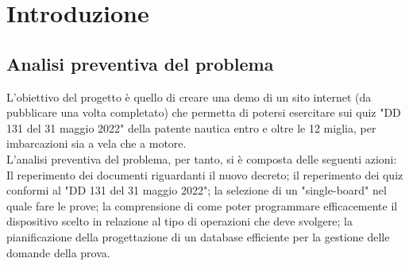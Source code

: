 \chapter{Introduzione}\label{cap:Introduzione}

\section{Analisi preventiva del problema}\label{sez:Analisi preventiva}

L'obiettivo del progetto è quello di creare una demo di un sito internet (da pubblicare una volta completato) che permetta di potersi esercitare sui quiz "DD 131 del 31 maggio 2022" della patente nautica entro e oltre le 12 miglia, per imbarcazioni sia a vela che a motore.\\
L'analisi preventiva del problema, per tanto, si è composta delle seguenti azioni: Il reperimento dei documenti riguardanti il nuovo decreto; il reperimento dei quiz conformi al "DD 131 del 31 maggio 2022"; la selezione di un "single-board" nel quale fare le prove; la comprensione di come poter programmare efficacemente il dispositivo scelto in relazione al tipo di operazioni che deve svolgere; la pianificazione della progettazione di un database efficiente per la gestione delle domande della prova.\\


